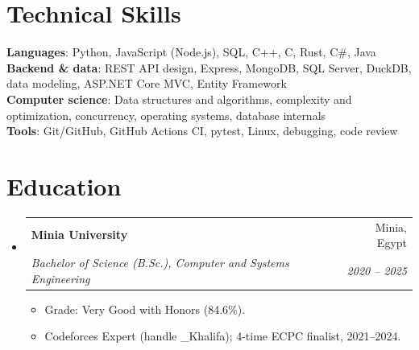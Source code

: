 \documentclass[letterpaper,11pt]{article}
\makeatletter
\newcommand{\resumeItem}[1]{
  \item\small{
    {#1 \vspace{-2pt}}
  }
}
\newcommand{\resumeSubheading}[4]{
  \vspace{-2pt}\item
    \begin{tabular*}{0.97\textwidth}[t]{l@{\extracolsep{\fill}}r}
      \textbf{#1} & #2 \\
      \textit{\small#3} & \textit{\small #4} \\
    \end{tabular*}\vspace{-7pt}
}
\newcommand{\resumeSubHeadingListStart}{\begin{itemize}[leftmargin=0.15in, label={}]}
\newcommand{\resumeSubHeadingListEnd}{\end{itemize}}
\newcommand{\resumeItemListStart}{\begin{itemize}}
\newcommand{\resumeItemListEnd}{\end{itemize}\vspace{-5pt}}
\makeatother
\begin{document}
%
\section{Technical Skills}
 \begin{itemize}[leftmargin=0.15in, label={}]
    \small{\item{
     \textbf{Languages}{: Python, JavaScript (Node.js), SQL, C++, C, Rust, C\#, Java} \\
     \textbf{Backend \& data}{: REST API design, Express, MongoDB, SQL Server, DuckDB, data modeling, ASP.NET Core MVC, Entity Framework} \\
     \textbf{Computer science}{: Data structures and algorithms, complexity and optimization, concurrency, operating systems, database internals} \\
     \textbf{Tools}{: Git/GitHub, GitHub Actions CI, pytest, Linux, debugging, code review}
    }}
 \end{itemize}

\section{Education}
  \resumeSubHeadingListStart
    \resumeSubheading
      {Minia University}{Minia, Egypt}
      {Bachelor of Science (B.Sc.), Computer and Systems Engineering}{2020 -- 2025}
      \resumeItemListStart
        \resumeItem{Grade: Very Good with Honors (84.6\%).}
        \resumeItem{Codeforces Expert (handle \_Khalifa); 4-time ECPC finalist, 2021--2024.}
      \resumeItemListEnd
  \resumeSubHeadingListEnd


\end{document}
